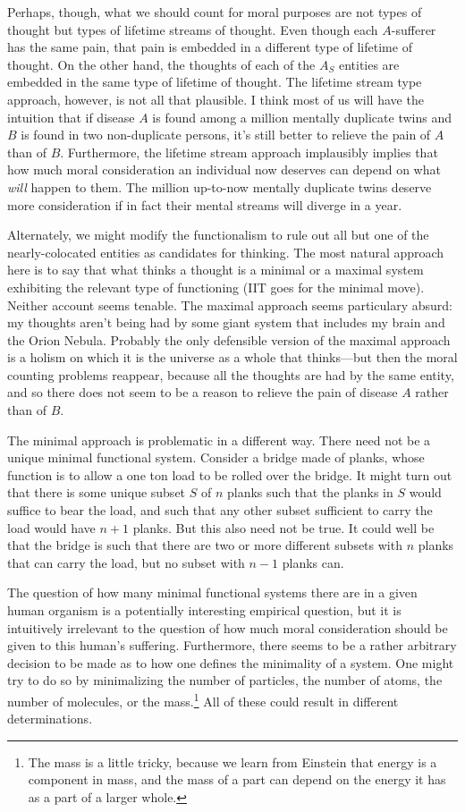 Perhaps, though, what we should count for moral purposes are not types of thought but types of lifetime streams of thought.
Even though each $A$-sufferer has the same pain, that pain is embedded in a different type of lifetime of thought. On the other 
hand, the thoughts of each of the $A_S$ entities are embedded in the same type of lifetime of thought. The lifetime stream type
approach, however, is not all that plausible. I think most of us will have the intuition that if disease $A$ is found among
a million mentally duplicate twins and $B$ is found in two non-duplicate persons, it's still better to relieve the pain of $A$ than of $B$. 
Furthermore, the lifetime stream approach implausibly implies that how much moral consideration an individual now deserves can depend on what 
\textit{will} happen to them. The million up-to-now mentally duplicate twins deserve more consideration if in fact
their mental streams will diverge in a year.

Alternately, we might modify the functionalism to rule out all but one of the nearly-colocated entities as candidates for
thinking. The most natural approach here is to say that what thinks a thought is a minimal or a maximal system exhibiting 
the relevant type of functioning (IIT goes for the minimal move). Neither account seems tenable. The maximal approach seems particulary absurd: my thoughts aren't 
being had by some giant system that includes my brain and the Orion Nebula. Probably the only defensible version of the maximal
approach is a holism on which it is the universe as a whole that thinks---but then the moral counting problems reappear, because
all the thoughts are had by the same entity, and so there does not seem to be a reason to relieve the pain of disease $A$ rather 
than of $B$. 

The minimal approach is problematic in a different way. There need not be a unique minimal functional 
system. Consider a bridge made of planks, whose function is to allow a one ton load to be rolled over the bridge. 
It might turn out that there is some unique subset $S$ of $n$ planks such that the planks in $S$ would suffice to 
bear the load, and such that any other subset sufficient to carry the load would have $n+1$ planks. But this also 
need not be true. It could well be that the bridge is such that there are two or more different subsets with $n$ 
planks that can carry the load, but no subset with $n-1$ planks can.

The question of how many minimal functional systems there are in a given human organism is a potentially interesting
empirical question, but it is intuitively irrelevant to the question of how much moral consideration should be given 
to this human's suffering. Furthermore, there seems to be a rather arbitrary decision to be made as to how one 
defines the minimality of a system. One might try to do so by minimalizing the number of particles, the number of atoms, the number of 
molecules, or the mass.\footnote{The mass is a little tricky, because we learn from Einstein that energy is a component in mass,
and the mass of a part can depend on the energy it has as a part of a larger whole.} All of these could result in 
different determinations.

